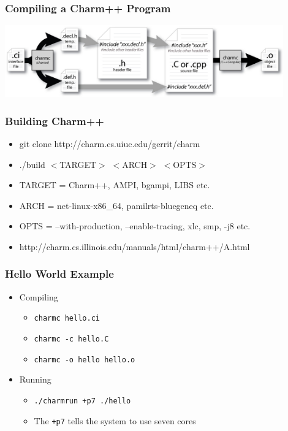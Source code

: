 \begin{frame}
   \frametitle{Compiling a Charm++ Program}
   \begin{center}
     \includegraphics[width=0.9\textwidth]{figures/charmCompile.jpg}
   \end{center}
\end{frame}

\begin{frame}
  \frametitle{Building Charm++}
  \begin{itemize}
  \item git clone http://charm.cs.uiuc.edu/gerrit/charm
  \item ./build $<$TARGET$>$ $<$ARCH$>$ $<$OPTS$>$
  \item TARGET = Charm++, AMPI, bgampi, LIBS etc.
  \item ARCH = net-linux-x86\_64, pamilrts-bluegeneq etc.
  \item OPTS = --with-production, --enable-tracing, xlc, smp, -j8 etc.
  \item http://charm.cs.illinois.edu/manuals/html/charm++/A.html
  \end{itemize}
\end{frame}

\begin{frame}
  \frametitle{Hello World Example}
  \begin{itemize}
    \item Compiling
      \begin{itemize}
      \item \texttt{charmc hello.ci}
      \item \texttt{charmc -c hello.C}
      \item \texttt{charmc -o hello hello.o}
      \end{itemize}
    \item Running
      \begin{itemize}
      \item \texttt{./charmrun +p7 ./hello}
      \item The \texttt{+p7} tells the system to use seven cores
      \end{itemize}
    \end{itemize}
\end{frame}


